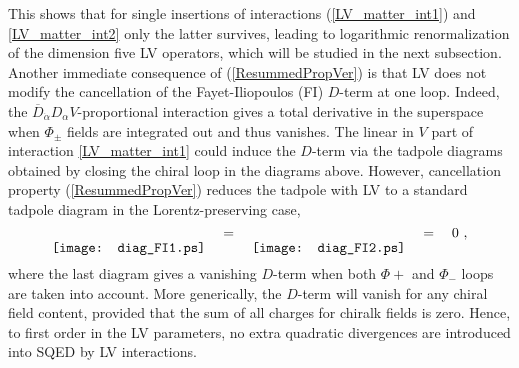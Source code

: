 \documentclass[12pt]{revtex4}
\begin{document}
This shows that for single insertions of interactions (\ref{LV_matter_int1}) and \eqref{LV_matter_int2}
only the latter survives, leading to
logarithmic renormalization of the dimension five LV operators, which
will be studied in the next subsection. 
Another immediate consequence of (\ref{ResummedPropVer}) is that LV does not 
modify the cancellation of the Fayet-Iliopoulos (FI) $D$-term at one loop. Indeed, the 
$\overline{D}_{\dot\alpha} D_\alpha V$-proportional interaction 
gives a total derivative in the superspace when $\Phi_{\pm}$ fields are integrated out
and thus vanishes. 
The linear in $V$ part of interaction  \eqref{LV_matter_int1} 
could induce the $D$-term via the tadpole diagrams
obtained by closing the chiral loop in the diagrams above. However, cancellation 
property (\ref{ResummedPropVer}) reduces the tadpole with LV to a standard 
tadpole diagram in the Lorentz-preserving case, 
\begin{equation}
\raisebox{-2.5ex}{\texttt{[image: diag\_FI1.ps]}}
\quad = \quad 
\raisebox{-2.5ex}{\texttt{[image: diag\_FI2.ps]}}
\quad = \quad 0~,
\end{equation}
where the last diagram gives a vanishing $D$-term when both $\Phi+$ and $\Phi_-$ loops are 
taken into account. More generically, the $D$-term will vanish for any chiral field content, 
provided that the sum of all charges for chiralk fields is zero. 
Hence, to first order in the LV parameters, no extra quadratic divergences are introduced into SQED
by LV interactions. 
\end{document}
